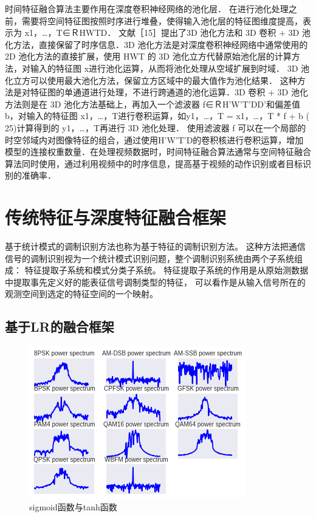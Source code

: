 时间特征融合算法主要作用在深度卷积神经网络的池化层． 在进行池化处理之前，需要将空间特征图按照时序进行堆叠，使得输入池化层的特征图维度提高，表示为 x1，…，T∈ＲHWTD． 文献［15］提出了3D 池化方法和 3D 卷积 + 3D 池化方法，直接保留了时序信息．3D 池化方法是对深度卷积神经网络中通常使用的 2D 池化方法的直接扩展，使用 HWT 的 3D 池化立方代替原始池化层的计算方法，对输入的特征图 x进行池化运算，从而将池化处理从空域扩展到时域． 3D 池化立方可以使用最大池化方法，保留立方区域中的最大值作为池化结果． 这种方法是对特征图的单通道进行处理，不进行跨通道的池化运算．3D 卷积 + 3D 池化方法则是在 3D 池化方法基础上，再加入一个滤波器 f∈ＲH'W'T'DD'和偏差值 b，对输入的特征图 x1，…，T进行卷积运算，如y1，…，T = x1，…，T * f + b ( 25)计算得到的 y1，…，T再进行 3D 池化处理． 使用滤波器 f 可以在一个局部的时空邻域内对图像特征的组合，通过使用H'W'T'D的卷积核进行卷积运算，增加模型的连接权重数量．在处理视频数据时，时间特征融合算法通常与空间特征融合算法同时使用，通过利用视频中的时序信息，提高基于视频的动作识别或者目标识别的准确率．


\section{传统特征与深度特征融合框架}

基于统计模式的调制识别方法也称为基于特征的调制识别方法。
这种方法把通信信号的调制识别视为一个统计模式识别问题，整个调制识别系统由两个子系统组成：
特征提取子系统和模式分类子系统。
特征提取子系统的作用是从原始测数据中提取事先定义好的能表征信号调制类型的特征，
可以看作是从输入信号所在的观测空间到选定的特征空间的一个映射。\par

\subsection{基于LR的融合框架}

\begin{figure}[!h]
	\centering
	\includegraphics[scale=0.9]{figures/chapter_3/signal_view_2}
	\caption{sigmoid函数与tanh函数}\label{fig_2_2}
\end{figure}

